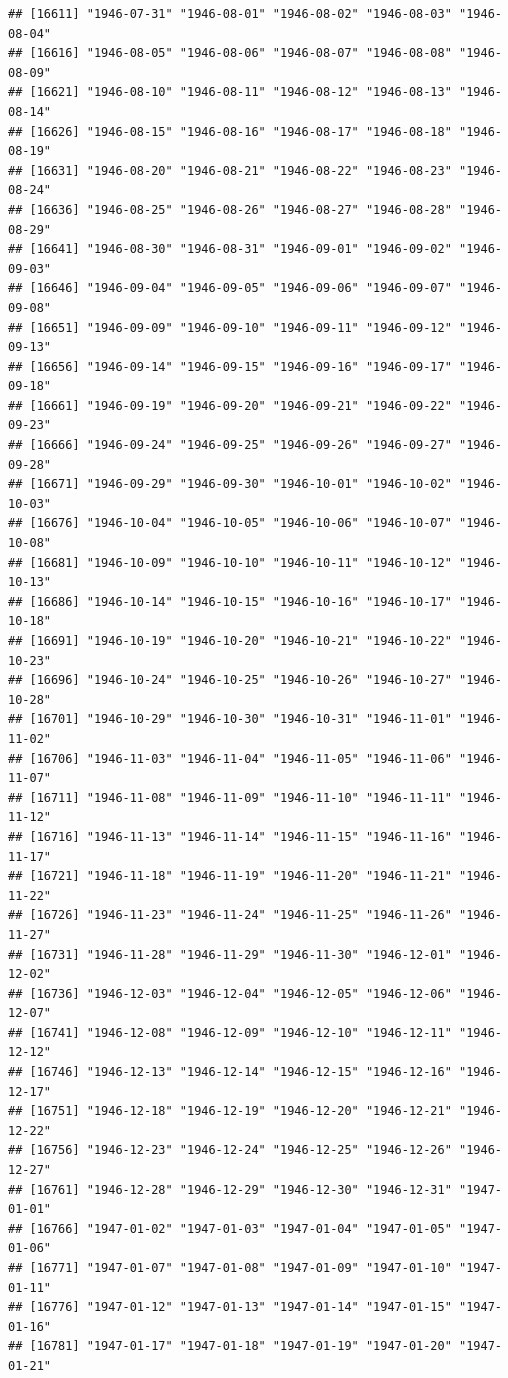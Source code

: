 \documentclass{article}\usepackage[]{graphicx}\usepackage[]{color}
\makeatletter
\newenvironment{kframe}{%
 \def\at@end@of@kframe{}%
 \ifinner\ifhmode%
  \def\at@end@of@kframe{\end{minipage}}%
  \begin{minipage}{\columnwidth}%
 \fi\fi%
 \def\FrameCommand##1{\hskip\@totalleftmargin \hskip-\fboxsep
 \colorbox{shadecolor}{##1}\hskip-\fboxsep
     \hskip-\linewidth \hskip-\@totalleftmargin \hskip\columnwidth}%
 \MakeFramed {\advance\hsize-\width
   \@totalleftmargin\z@ \linewidth\hsize
   \@setminipage}}%
 {\par\unskip\endMakeFramed%
 \at@end@of@kframe}
\newenvironment{knitrout}{}{} %
\makeatother
\begin{document}
\begin{description}
\begin{knitrout}
\begin{kframe}
\begin{verbatim}
## [16611] "1946-07-31" "1946-08-01" "1946-08-02" "1946-08-03" "1946-08-04"
## [16616] "1946-08-05" "1946-08-06" "1946-08-07" "1946-08-08" "1946-08-09"
## [16621] "1946-08-10" "1946-08-11" "1946-08-12" "1946-08-13" "1946-08-14"
## [16626] "1946-08-15" "1946-08-16" "1946-08-17" "1946-08-18" "1946-08-19"
## [16631] "1946-08-20" "1946-08-21" "1946-08-22" "1946-08-23" "1946-08-24"
## [16636] "1946-08-25" "1946-08-26" "1946-08-27" "1946-08-28" "1946-08-29"
## [16641] "1946-08-30" "1946-08-31" "1946-09-01" "1946-09-02" "1946-09-03"
## [16646] "1946-09-04" "1946-09-05" "1946-09-06" "1946-09-07" "1946-09-08"
## [16651] "1946-09-09" "1946-09-10" "1946-09-11" "1946-09-12" "1946-09-13"
## [16656] "1946-09-14" "1946-09-15" "1946-09-16" "1946-09-17" "1946-09-18"
## [16661] "1946-09-19" "1946-09-20" "1946-09-21" "1946-09-22" "1946-09-23"
## [16666] "1946-09-24" "1946-09-25" "1946-09-26" "1946-09-27" "1946-09-28"
## [16671] "1946-09-29" "1946-09-30" "1946-10-01" "1946-10-02" "1946-10-03"
## [16676] "1946-10-04" "1946-10-05" "1946-10-06" "1946-10-07" "1946-10-08"
## [16681] "1946-10-09" "1946-10-10" "1946-10-11" "1946-10-12" "1946-10-13"
## [16686] "1946-10-14" "1946-10-15" "1946-10-16" "1946-10-17" "1946-10-18"
## [16691] "1946-10-19" "1946-10-20" "1946-10-21" "1946-10-22" "1946-10-23"
## [16696] "1946-10-24" "1946-10-25" "1946-10-26" "1946-10-27" "1946-10-28"
## [16701] "1946-10-29" "1946-10-30" "1946-10-31" "1946-11-01" "1946-11-02"
## [16706] "1946-11-03" "1946-11-04" "1946-11-05" "1946-11-06" "1946-11-07"
## [16711] "1946-11-08" "1946-11-09" "1946-11-10" "1946-11-11" "1946-11-12"
## [16716] "1946-11-13" "1946-11-14" "1946-11-15" "1946-11-16" "1946-11-17"
## [16721] "1946-11-18" "1946-11-19" "1946-11-20" "1946-11-21" "1946-11-22"
## [16726] "1946-11-23" "1946-11-24" "1946-11-25" "1946-11-26" "1946-11-27"
## [16731] "1946-11-28" "1946-11-29" "1946-11-30" "1946-12-01" "1946-12-02"
## [16736] "1946-12-03" "1946-12-04" "1946-12-05" "1946-12-06" "1946-12-07"
## [16741] "1946-12-08" "1946-12-09" "1946-12-10" "1946-12-11" "1946-12-12"
## [16746] "1946-12-13" "1946-12-14" "1946-12-15" "1946-12-16" "1946-12-17"
## [16751] "1946-12-18" "1946-12-19" "1946-12-20" "1946-12-21" "1946-12-22"
## [16756] "1946-12-23" "1946-12-24" "1946-12-25" "1946-12-26" "1946-12-27"
## [16761] "1946-12-28" "1946-12-29" "1946-12-30" "1946-12-31" "1947-01-01"
## [16766] "1947-01-02" "1947-01-03" "1947-01-04" "1947-01-05" "1947-01-06"
## [16771] "1947-01-07" "1947-01-08" "1947-01-09" "1947-01-10" "1947-01-11"
## [16776] "1947-01-12" "1947-01-13" "1947-01-14" "1947-01-15" "1947-01-16"
## [16781] "1947-01-17" "1947-01-18" "1947-01-19" "1947-01-20" "1947-01-21"

\end{verbatim}
\end{kframe}
\end{knitrout}
\end{description}
\end{document}

